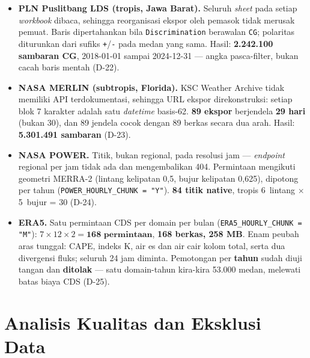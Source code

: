 \begin{itemize}
    \item \textbf{PLN Puslitbang LDS (tropis, Jawa Barat).} Seluruh
          \textit{sheet} pada setiap \textit{workbook} dibaca, sehingga
          reorganisasi ekspor oleh pemasok tidak merusak pemuat. Baris
          dipertahankan bila \texttt{Discrimination} berawalan \texttt{CG};
          polaritas diturunkan dari sufiks \texttt{+}/\texttt{-} pada medan yang
          sama. Hasil: \textbf{2.242.100 sambaran CG}, 2018-01-01 sampai
          2024-12-31 --- angka pasca-filter, bukan cacah baris mentah (D-22).
    \item \textbf{NASA MERLIN (subtropis, Florida).} KSC Weather Archive tidak
          memiliki API terdokumentasi, sehingga URL ekspor direkonstruksi:
          setiap blok 7 karakter adalah satu \textit{datetime} basis-62.
          \textbf{89 ekspor} berjendela \textbf{29 hari} (bukan 30), dan 89
          jendela cocok dengan 89 berkas secara dua arah. Hasil:
          \textbf{5.301.491 sambaran} (D-23).
    \item \textbf{NASA POWER.} Titik, bukan regional, pada resolusi jam ---
          \textit{endpoint} regional per jam tidak ada dan mengembalikan 404.
          Permintaan mengikuti geometri MERRA-2 (lintang kelipatan
          0,5, bujur kelipatan 0,625), dipotong per tahun
          (\texttt{POWER\_HOURLY\_CHUNK = "Y"}). \textbf{84 titik native}, tropis
          6~lintang $\times$ 5~bujur = 30 (D-24).
    \item \textbf{ERA5.} Satu permintaan CDS per domain per bulan
          (\texttt{ERA5\_HOURLY\_CHUNK = "M"}): $7 \times 12 \times 2 =
          \textbf{168 permintaan}$, \textbf{168 berkas, 258 MB}. Enam peubah
          aras tunggal: CAPE, indeks K, air es dan air cair kolom total, serta
          dua divergensi fluks; seluruh 24 jam diminta. Pemotongan per
          \textbf{tahun} sudah diuji tangan dan \textbf{ditolak} --- satu
          domain-tahun kira-kira 53.000 medan, melewati batas biaya CDS
          (D-25).
\end{itemize}


\section{Analisis Kualitas dan Eksklusi Data}
\label{sec:kualitas-data}

